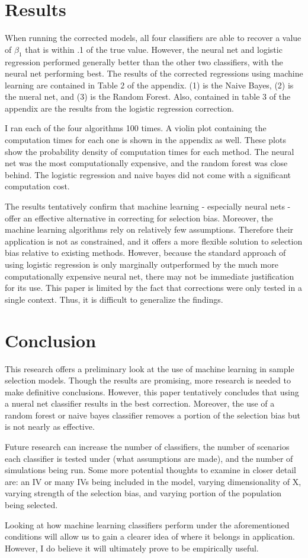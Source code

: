 \documentclass[12pt,english]{article}
\begin{document}
\section{Results}
When running the corrected models, all four classifiers are able to recover a value of $\beta_1$ that is within .1 of the true value. However, the neural net and logistic regression performed generally better than the other two classifiers, with the neural net performing best. The results of the corrected regressions using machine learning are contained in Table 2 of the appendix. (1) is the Naive Bayes, (2) is the nueral net, and (3) is the Random Forest. Also, contained in table 3 of the appendix are the results from the logistic regression correction.
\par
I ran each of the four algorithms 100 times. A violin plot containing the computation times for each one is shown in the appendix as well. These plots show the probability density of computation times for each method. The neural net was the most computationally expensive, and the random forest was close behind. The logistic regression and naive bayes did not come with a significant computation cost.
\par
The results tentatively confirm that machine learning - especially neural nets - offer an effective alternative in correcting for selection bias. Moreover, the machine learning algorithms rely on relatively few assumptions. Therefore their application is not as constrained, and it offers a more flexible solution to selection bias relative to existing methods. However, because the standard approach of using logistic regression is only marginally outperformed by the much more computationally expensive neural net, there may not be immediate justification for its use. This paper is limited by the fact that corrections were only tested in a single context. Thus, it is difficult to generalize the findings.
\section{Conclusion}
This research offers a preliminary look at the use of machine learning in sample selection models. Though the results are promising, more research is needed to make definitive conclusions. However, this paper tentatively concludes that using a nueral net classifier results in the best correction. Moreover, the use of a random forest or naive bayes classifier removes a portion of the selection bias but is not nearly as effective.
\par
Future research can increase the number of classifiers, the number of scenarios each classifier is tested under (what assumptions are made), and the number of simulations being run. Some more potential thoughts to examine in closer detail are: an IV or many IVs being included in the model, varying dimensionality of X, varying strength of the selection bias, and  varying portion of the population being selected.
\par
Looking at how machine learning classifiers perform under the aforementioned conditions will allow us to gain a clearer idea of where it belongs in application. However, I do believe it will ultimately prove to be empirically useful.
\end{document}
